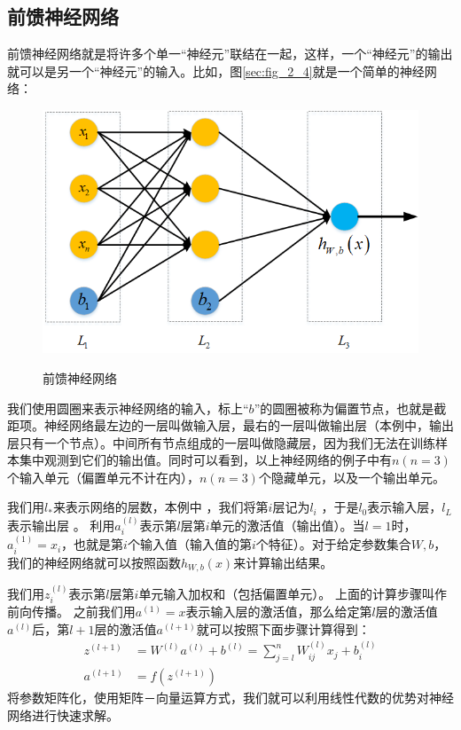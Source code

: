 \subsection{前馈神经网络}
前馈神经网络就是将许多个单一“神经元”联结在一起，这样，一个“神经元”的输出就可以是另一个“神经元”的输入。比如，图\ref{sec:fig_2_4}就是一个简单的神经网络：\par
\begin{figure}
	\centering
	\includegraphics[scale=0.7]{figures/chapter_2/fig_2_4}\label{sec:fig_2_4}
	\caption{前馈神经网络}\label{fig_2_4}
\end{figure}
我们使用圆圈来表示神经网络的输入，标上“$b$”的圆圈被称为偏置节点，也就是截距项。神经网络最左边的一层叫做输入层，最右的一层叫做输出层（本例中，输出层只有一个节点）。中间所有节点组成的一层叫做隐藏层，因为我们无法在训练样本集中观测到它们的输出值。同时可以看到，以上神经网络的例子中有$n(n=3)$个输入单元（偏置单元不计在内），$n(n=3)$个隐藏单元，以及一个输出单元。\par

 我们用$l_{*}$来表示网络的层数，本例中 ，我们将第$i$层记为$l_i$ ，于是$l_{0}$表示输入层，$l_L$表示输出层 。
利用$a^{(l)}_i$表示第$l$层第$i$单元的激活值（输出值）。当$l=1$时，$a^{(1)}_i = x_i$，也就是第$i$个输入值（输入值的第$i$个特征）。对于给定参数集合$W,b$，我们的神经网络就可以按照函数$h_{W,b}(x)$来计算输出结果。\par
 
我们用$z^{(l)}_i$表示第$l$层第$i$单元输入加权和（包括偏置单元）。
上面的计算步骤叫作前向传播。
之前我们用$a^{(1)} = x$表示输入层的激活值，那么给定第$l$层的激活值$a^{(l)}$后，第$l+1$层的激活值$a^{(l+1)}$就可以按照下面步骤计算得到：
\begin{align}
	z^{(l+1)} &= W^{(l)} a^{(l)} + b^{(l)}=\sum_{j=l}^n W^{(l)}_{ij} x_j + b^{(l)}_i\\
	a^{(l+1)} &= f(z^{(l+1)})
\end{align}
将参数矩阵化，使用矩阵－向量运算方式，我们就可以利用线性代数的优势对神经网络进行快速求解。\par

